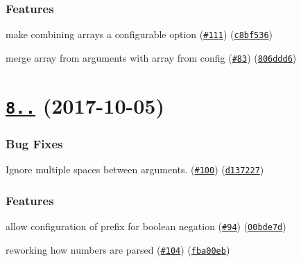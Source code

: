 \subsubsection*{Features}


\begin{DoxyItemize}
\item make combining arrays a configurable option (\href{https://github.com/yargs/yargs-parser/issues/111}{\tt \#111}) (\href{https://github.com/yargs/yargs-parser/commit/c8bf536}{\tt c8bf536})
\item merge array from arguments with array from config (\href{https://github.com/yargs/yargs-parser/issues/83}{\tt \#83}) (\href{https://github.com/yargs/yargs-parser/commit/806ddd6}{\tt 806ddd6})
\end{DoxyItemize}

\label{_8.0.0}%
 \section*{\href{https://github.com/yargs/yargs-parser/compare/v7.0.0...v8.0.0}{\tt 8..} (2017-\/10-\/05)}

\subsubsection*{Bug Fixes}


\begin{DoxyItemize}
\item Ignore multiple spaces between arguments. (\href{https://github.com/yargs/yargs-parser/issues/100}{\tt \#100}) (\href{https://github.com/yargs/yargs-parser/commit/d137227}{\tt d137227})
\end{DoxyItemize}

\subsubsection*{Features}


\begin{DoxyItemize}
\item allow configuration of prefix for boolean negation (\href{https://github.com/yargs/yargs-parser/issues/94}{\tt \#94}) (\href{https://github.com/yargs/yargs-parser/commit/00bde7d}{\tt 00bde7d})
\item reworking how numbers are parsed (\href{https://github.com/yargs/yargs-parser/issues/104}{\tt \#104}) (\href{https://github.com/yargs/yargs-parser/commit/fba00eb}{\tt fba00eb})
\end{DoxyItemize}


